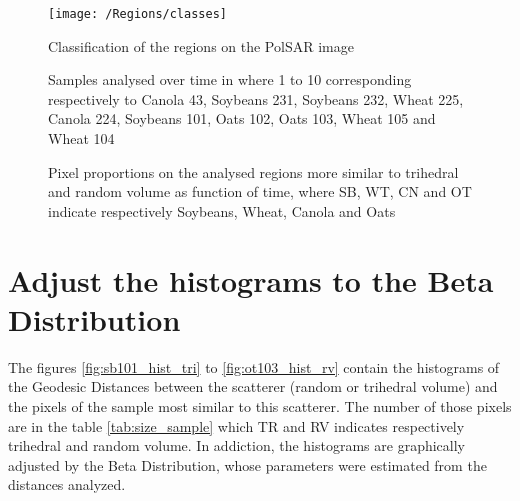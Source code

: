 \documentclass[12pt]{article}
\begin{document}
\begin{figure}[!h]
\centering
\texttt{[image: /Regions/classes]}
\label{fig:classes}
\caption{Classification of the regions on the PolSAR image}
\end{figure}

\begin{figure*}[!h]
\centering


\caption{Samples analysed over time in where 1 to 10 corresponding respectively to Canola 43, Soybeans 231, Soybeans 232, Wheat 225, Canola 224, Soybeans 101, Oats 102, Oats 103, Wheat 105 and Wheat 104}
\label{fig:regions}
\end{figure*}

\begin{figure*}[!h]
\centering
{}
\caption{Pixel proportions on the analysed regions more similar to trihedral and random volume as function of time, where SB, WT, CN and OT indicate respectively Soybeans, Wheat, Canola and Oats}
\label{fig:pixel_proportions}
\end{figure*}

\newpage

\section{Adjust the histograms to the Beta Distribution}

The figures \ref{fig:sb101_hist_tri} to \ref{fig:ot103_hist_rv} contain the histograms of the Geodesic Distances between the scatterer (random or trihedral volume) and the pixels of the sample most similar to this scatterer.
The number of those pixels are in the table \ref{tab:size_sample} which TR and RV indicates respectively trihedral and random volume. In addiction, the histograms are graphically adjusted by the Beta Distribution, whose parameters were estimated from the distances analyzed.
\end{document}
